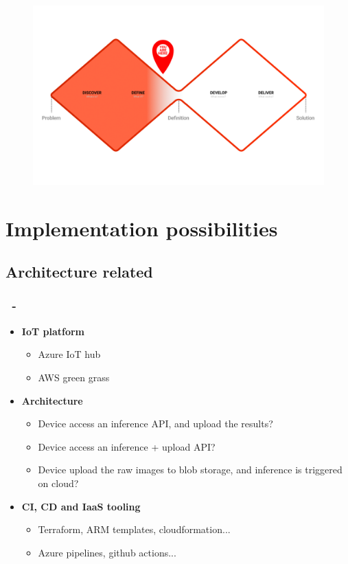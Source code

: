 \documentclass{beamer}
\makeatletter
\newcommand*{\currentname}{\@currentlabelname}
\makeatother
\begin{document}
\begin{frame}
\frametitle{\secname}
\begin{figure}
\includegraphics[width=0.9\linewidth]{Imagens/V1 B.jpg}
\end{figure}
\end{frame}


\section{Implementation possibilities}
\begin{frame}
\centering \Huge {\currentname}
\end{frame}


\subsection{Architecture related}
\begin{frame}
\frametitle{\secname\ - \subsecname}
\begin{itemize}
\item \textbf{IoT platform}
\begin{itemize}
    \item Azure IoT hub
    \item AWS green grass
\end{itemize}
\item \textbf{Architecture}
\begin{itemize}
    \item Device access an inference API, and upload the results?
    \item Device access an inference + upload API?
    \item Device upload the raw images to blob storage, and inference is triggered on cloud?
\end{itemize}
\item \textbf{CI, CD and IaaS tooling}
\begin{itemize}
    \item Terraform, ARM templates, cloudformation...
    \item Azure pipelines, github actions...
\end{itemize}
\end{itemize}
\end{frame}
\end{document}
